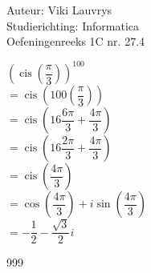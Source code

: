 \documentclass[a4paper]{article}
\begin{document}
  
\noindent \large Auteur: Viki Lauvrys        \\
\noindent \large Studierichting: Informatica \\
\noindent \large Oefeningenreeks 1C nr. 27.4 \\

\medskip

\normalsize

$ \left( \operatorname{cis} \left( \dfrac{\pi}{3} \right) \right)^{100} $ \\

$ = \operatorname{cis} \left( 100 \left(\dfrac{\pi}{3} \right) \right) $ \\

$ = \operatorname{cis} \left( 16 \dfrac{6 \pi}{3} + \dfrac{4 \pi}{3} \right) $ \\

$ = \operatorname{cis} \left( 16 \dfrac{2 \pi}{3} + \dfrac{4 \pi}{3} \right) $ \\

$ = \operatorname{cis} \left( \dfrac{4 \pi}{3} \right) $ \\

$ = \cos \left( \dfrac{4 \pi}{3} \right) + i \sin \left( \dfrac{4 \pi}{3} \right) $ \\

$ = - \dfrac{1}{2} - \dfrac{\sqrt{3}}{2} i $ \\

\begin{thebibliography}{999}
\end{thebibliography}
\end{document}
